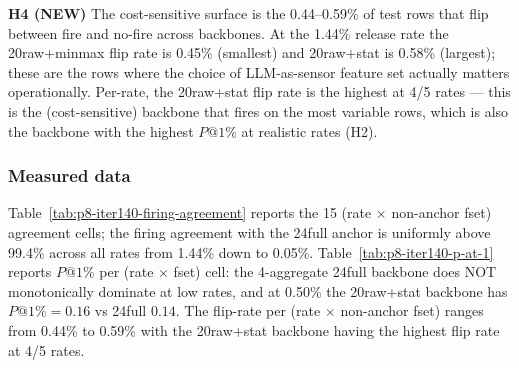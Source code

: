 \textbf{H4 (NEW)} The cost-sensitive surface is the 0.44--0.59\%
of test rows that flip between fire and no-fire across backbones.
At the 1.44\% release rate the 20raw+minmax flip rate is 0.45\%
(smallest) and 20raw+stat is 0.58\% (largest); these are the rows
where the choice of LLM-as-sensor feature set actually matters
operationally.  Per-rate, the 20raw+stat flip rate is the
highest at 4/5 rates --- this is the (cost-sensitive) backbone
that fires on the most variable rows, which is also the
backbone with the highest $P@1\%$ at realistic rates (H2).

\subsubsection{Measured data}
Table~\ref{tab:p8-iter140-firing-agreement} reports the 15
(rate $\times$ non-anchor fset) agreement cells; the firing
agreement with the 24full anchor is uniformly above 99.4\%
across all rates from 1.44\% down to 0.05\%.  Table~\ref{tab:p8-iter140-p-at-1}
reports $P@1\%$ per (rate $\times$ fset) cell: the 4-aggregate
24full backbone does NOT monotonically dominate at low rates,
and at 0.50\% the 20raw+stat backbone has $P@1\%{=}0.16$ vs
24full $0.14$.  The flip-rate per (rate $\times$ non-anchor fset)
ranges from 0.44\% to 0.59\% with the 20raw+stat backbone having
the highest flip rate at 4/5 rates.


